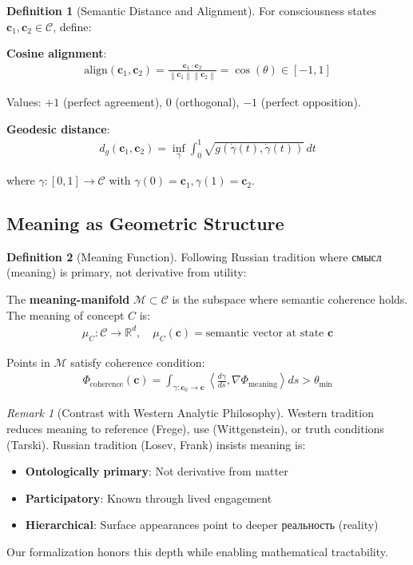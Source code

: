 \documentclass[11pt,a4paper]{article}
\theoremstyle{definition}
\newtheorem{definition}{Definition}[section]
\theoremstyle{remark}
\newtheorem{remark}{Remark}[section]
\newcommand{\RR}{\mathbb{R}}
\newcommand{\CC}{\mathcal{C}}
\newcommand{\cc}{\mathbf{c}}
\newcommand{\norm}[1]{\left\|#1\right\|}
\begin{document}
\begin{definition}[Semantic Distance and Alignment]
For consciousness states \(\cc_1, \cc_2 \in \CC\), define:

\textbf{Cosine alignment}:
\begin{align}
\text{align}(\cc_1, \cc_2) = \frac{\cc_1 \cdot \cc_2}{\norm{\cc_1} \norm{\cc_2}} = \cos(\theta) \in [-1, 1]
\end{align}

Values: \(+1\) (perfect agreement), \(0\) (orthogonal), \(-1\) (perfect opposition).

\textbf{Geodesic distance}:
\begin{align}
d_g(\cc_1, \cc_2) = \inf_{\gamma} \int_0^1 \sqrt{g(\dot{\gamma}(t), \dot{\gamma}(t))} \, dt
\end{align}

where \(\gamma: [0,1] \to \CC\) with \(\gamma(0) = \cc_1, \gamma(1) = \cc_2\).
\end{definition}

\subsection{Meaning as Geometric Structure}

\begin{definition}[Meaning Function]
Following Russian tradition where смысл (meaning) is primary, not derivative from utility:

The \textbf{meaning-manifold} \(\mathcal{M} \subset \CC\) is the subspace where semantic coherence holds. The meaning of concept \(C\) is:
\begin{align}
\mu_C: \CC \rightarrow \RR^d, \quad \mu_C(\cc) = \text{semantic vector at state } \cc
\end{align}

Points in \(\mathcal{M}\) satisfy coherence condition:
\begin{align}
\Phi_{\text{coherence}}(\cc) = \int_{\gamma: \cc_0 \to \cc} \left\langle \frac{d\gamma}{ds}, \nabla \Phi_{\text{meaning}} \right\rangle ds > \theta_{\min}
\end{align}
\end{definition}

\begin{remark}[Contrast with Western Analytic Philosophy]
Western tradition reduces meaning to reference (Frege), use (Wittgenstein), or truth conditions (Tarski). Russian tradition (Losev, Frank) insists meaning is:
\begin{itemize}
\item \textbf{Ontologically primary}: Not derivative from matter
\item \textbf{Participatory}: Known through lived engagement
\item \textbf{Hierarchical}: Surface appearances point to deeper реальность (reality)
\end{itemize}

Our formalization honors this depth while enabling mathematical tractability.
\end{remark}
\end{document}
